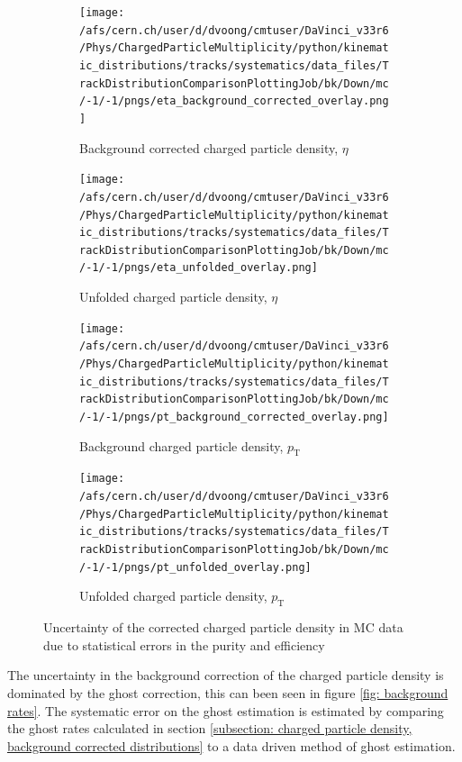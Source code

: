\begin{figure}[h]
	\begin{subfigure}{0.49\textwidth}
		\texttt{[image: /afs/cern.ch/user/d/dvoong/cmtuser/DaVinci\_v33r6/Phys/ChargedParticleMultiplicity/python/kinematic\_distributions/tracks/systematics/data\_files/TrackDistributionComparisonPlottingJob/bk/Down/mc/-1/-1/pngs/eta\_background\_corrected\_overlay.png]}
		\caption{Background corrected charged particle density, $\eta$}
	\end{subfigure}
	\begin{subfigure}{0.49\textwidth}
		\texttt{[image: /afs/cern.ch/user/d/dvoong/cmtuser/DaVinci\_v33r6/Phys/ChargedParticleMultiplicity/python/kinematic\_distributions/tracks/systematics/data\_files/TrackDistributionComparisonPlottingJob/bk/Down/mc/-1/-1/pngs/eta\_unfolded\_overlay.png]}
		\caption{Unfolded charged particle density, $\eta$}
	\end{subfigure}
	\begin{subfigure}{0.49\textwidth}
		\texttt{[image: /afs/cern.ch/user/d/dvoong/cmtuser/DaVinci\_v33r6/Phys/ChargedParticleMultiplicity/python/kinematic\_distributions/tracks/systematics/data\_files/TrackDistributionComparisonPlottingJob/bk/Down/mc/-1/-1/pngs/pt\_background\_corrected\_overlay.png]}
		\caption{Background  charged particle density, $p_\mathrm{T}$}
	\end{subfigure}
	\begin{subfigure}{0.49\textwidth}
		\texttt{[image: /afs/cern.ch/user/d/dvoong/cmtuser/DaVinci\_v33r6/Phys/ChargedParticleMultiplicity/python/kinematic\_distributions/tracks/systematics/data\_files/TrackDistributionComparisonPlottingJob/bk/Down/mc/-1/-1/pngs/pt\_unfolded\_overlay.png]}
		\caption{Unfolded charged particle density, $p_\mathrm{T}$}
	\end{subfigure}
	\caption{Uncertainty of the corrected charged particle density in MC data due to statistical errors in the purity and efficiency}
	\label{fig: statistical uncertainty of corrected charged particle density, mc data}
\end{figure}

The uncertainty in the background correction of the charged particle density is dominated by the ghost correction, this can been seen in figure \ref{fig: background rates}. The systematic error on the ghost estimation is estimated by comparing the ghost rates calculated in section \ref{subsection: charged particle density, background corrected distributions} to a data driven method of ghost estimation. 

